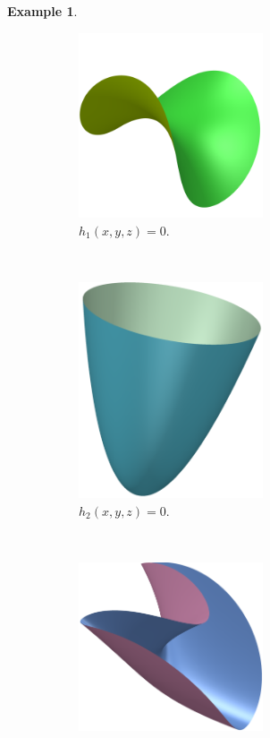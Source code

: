 \documentclass{article}
\theoremstyle{definition}
\newtheorem{example}{Example}
\begin{document}
\begin{example}
    \begin{figure}[]
        \centering
        \begin{subfigure}[t]{0.3\textwidth}
            \includegraphics[height=0.6\textwidth, width=0.6\textwidth]{../pictures/example_one.png}
            \caption{$h_1(x, y, z) = 0$.}
        \end{subfigure}
        ~
        \begin{subfigure}[t]{0.3\textwidth}
            \includegraphics[height=0.6\textwidth, width=0.6\textwidth]{../pictures/example_two.png}
            \caption{$h_2(x, y, z) = 0$.}
        \end{subfigure}
        ~
        \begin{subfigure}[t]{0.3\textwidth}
            \includegraphics[height=0.6\textwidth, width=0.6\textwidth]{../pictures/example_three.png}

\end{subfigure}
\end{figure}
\end{example}
\end{document}
